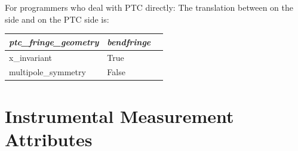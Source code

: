For programmers who deal with PTC directly: The translation between
 on the \bmad side and  on the
PTC side is:

\begin{center}
\begin{tabular}{lll} \hline 
{\em ptc_fringe_geometry} & {\em bendfringe} \\ \hline
  x_invariant             & True  \\
  multipole_symmetry      & False \\
\end{tabular}
\end{center}

\section{Instrumental Measurement Attributes}
\label{s:meas.attrib}


